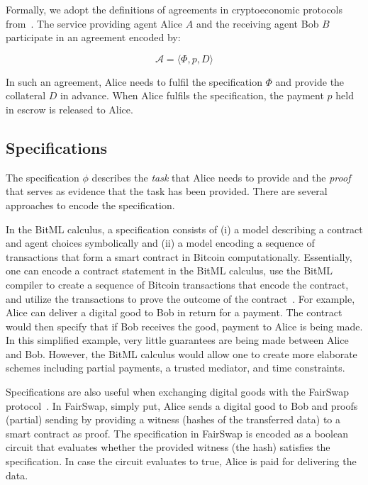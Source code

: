 \documentclass[runningheads]{llncs}
\begin{document}
Formally, we adopt the definitions of agreements in cryptoeconomic protocols from~\cite{Harz2019Balance}.
The service providing agent Alice $A$ and the receiving agent Bob $B$ participate in an agreement encoded by:

\begin{equation}
	\mathcal{A} = \langle \Phi, p, D \rangle
\end{equation}

In such an agreement, Alice needs to fulfil the specification $\Phi$ and provide the collateral $D$ in advance.
When Alice fulfils the specification, the payment $p$ held in escrow is released to Alice.

\subsection{Specifications}
The specification $\phi$ describes the \emph{task} that Alice needs to provide and the \emph{proof} that serves as evidence that the task has been provided.
There are several approaches to encode the specification.

In the BitML calculus, a specification consists of (i) a model describing a contract and agent choices symbolically and (ii) a model encoding a sequence of transactions that form a smart contract in Bitcoin computationally.
Essentially, one can encode a contract statement in the BitML calculus, use the BitML compiler to create a sequence of Bitcoin transactions that encode the contract, and utilize the transactions to prove the outcome of the contract~\cite{Bartoletti2018}.
For example, Alice can deliver a digital good to Bob in return for a payment.
The contract would then specify that if Bob receives the good, payment to Alice is being made.
In this simplified example, very little guarantees are being made between Alice and Bob.
However, the BitML calculus would allow one to create more elaborate schemes including partial payments, a trusted mediator, and time constraints.

Specifications are also useful when exchanging digital goods with the FairSwap protocol~\cite{Dziembowski2018FairSwap}.
In FairSwap, simply put, Alice sends a digital good to Bob and proofs (partial) sending by providing a witness (hashes of the transferred data) to a smart contract as proof.
The specification in FairSwap is encoded as a boolean circuit that evaluates whether the provided witness (the hash) satisfies the specification.
In case the circuit evaluates to true, Alice is paid for delivering the data.
\end{document}
